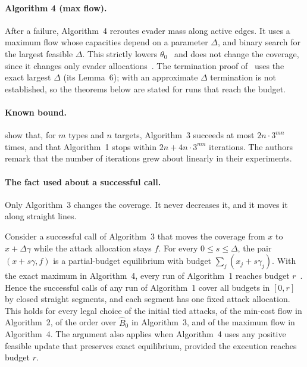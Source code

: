 \paragraph{Algorithm 4 (max flow).} After a failure, Algorithm~4 reroutes evader mass along active
edges. It uses a maximum flow whose capacities depend on a parameter $\Delta$, and binary search for the
largest feasible $\Delta$. This strictly lowers $\theta_0$~\cite[Lemma~5]{lck16} and does not change the coverage, since it changes only evader allocations~\cite[Algorithm~4, line~21]{lck16}. The termination proof of~\cite[Theorem~5]{lck16} uses the exact largest $\Delta$ (its Lemma~6); with an approximate $\Delta$ termination is not established, so the theorems below are stated for runs that reach the budget.

\paragraph{Known bound.} \cite[Lemma~8, Theorem~5]{lck16} show that, for $m$ types and $n$ targets,
Algorithm~3 succeeds at most $2n\cdot3^{mn}$ times, and that Algorithm~1 stops within
$2n+4n\cdot3^{mn}$ iterations. The authors remark that the number of iterations grew about linearly in
their experiments.

\paragraph{The fact used about a successful call.} Only Algorithm~3 changes the coverage. It never
decreases it, and it moves it along straight lines.

\begin{lemma}\label{artlck:lem:seg}
\statusrefereed
Consider a successful call of Algorithm~3 that moves the coverage from $x$ to $x+\Delta\gamma$ while the
attack allocation stays $f$. For every $0\le s\le\Delta$, the pair $(x+s\gamma,f)$ is a partial-budget
equilibrium with budget $\sum_j(x_j+s\gamma_j)$. With the exact maximum in Algorithm~4, every run of Algorithm~1 reaches budget $r$~\cite[Theorem~5]{lck16}. Hence the successful calls of any run of Algorithm~1
cover all budgets in $[0,r]$ by closed straight segments, and each segment has one fixed attack
allocation. This holds for every legal choice of the initial tied attacks, of the min-cost flow in
Algorithm~2, of the order over $\hat B_0$ in Algorithm~3, and of the maximum flow in Algorithm~4. The argument
also applies when Algorithm~4 uses any positive feasible update that preserves exact equilibrium, provided the execution reaches budget $r$.
\end{lemma}

